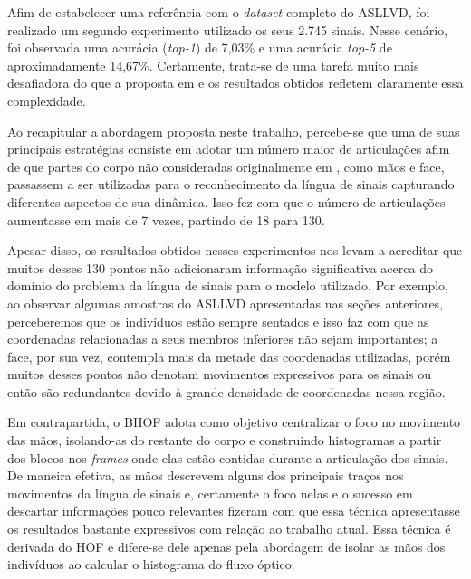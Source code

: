 
Afim de estabelecer uma referência com o \textit{dataset} completo do ASLLVD, foi realizado um segundo experimento utilizado os seus 2.745 sinais. Nesse cenário, foi observada uma acurácia (\textit{top-1}) de 7,03\% e uma acurácia \textit{top-5} de aproximadamente 14,67\%. Certamente, trata-se de uma tarefa muito mais desafiadora do que a proposta em \cite{lim-2016} e os resultados obtidos refletem claramente essa complexidade. 



Ao recapitular a abordagem proposta neste trabalho, percebe-se que uma de suas principais estratégias consiste em adotar um número maior de articulações afim de que partes do corpo não consideradas originalmente em \cite{st-gcn-2018}, como mãos e face, passassem a ser utilizadas para o reconhecimento da língua de sinais capturando diferentes aspectos de sua dinâmica. Isso fez com que o número de articulações aumentasse em mais de 7 vezes, partindo de 18 para 130. 

Apesar disso, os resultados obtidos nesses experimentos nos levam a acreditar que muitos desses 130 pontos não adicionaram informação significativa acerca do domínio do problema da língua de sinais para o modelo utilizado. Por exemplo, ao observar algumas amostras do ASLLVD apresentadas nas seções anteriores, perceberemos que os indivíduos estão sempre sentados e isso faz com que as coordenadas relacionadas a seus membros inferiores não sejam importantes; a face, por sua vez, contempla mais da metade das coordenadas utilizadas, porém muitos desses pontos não denotam movimentos expressivos para os sinais ou então são redundantes devido à grande densidade de coordenadas nessa região. 

Em contrapartida, o BHOF \cite{lim-2016} adota como objetivo centralizar o foco no movimento das mãos, isolando-as do restante do corpo e construindo histogramas a partir dos blocos nos \textit{frames} onde elas estão contidas durante a articulação dos sinais. De maneira efetiva, as mãos descrevem alguns dos principais traços nos movimentos da língua de sinais e, certamente o foco nelas e o sucesso em descartar informações pouco relevantes fizeram com que essa técnica apresentasse os resultados bastante expressivos com relação ao trabalho atual. Essa técnica é derivada do HOF e difere-se dele apenas pela abordagem de isolar as mãos dos indivíduos ao calcular o histograma do fluxo óptico.

